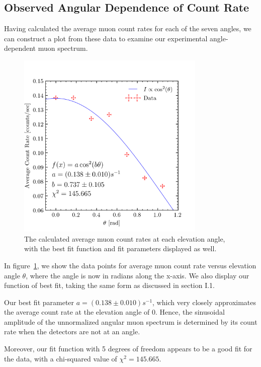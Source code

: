 \documentclass[aps,twocolumn,secnumarabic,balancelastpage,amsmath,amssymb,nofootinbib, floatfix]{revtex4-2}
\begin{document}
	\subsection{Observed Angular Dependence of Count Rate}
	Having calculated the average muon count rates for each of the seven angles, we can construct a plot from these data to examine our experimental angle-dependent muon spectrum. 
	\begin{figure}[H]
		\includegraphics[width=9cm]{rate_vs_theta_fitted.png}
		\caption{The calculated average muon count rates at each elevation angle, with the best fit function and fit parameters displayed as well.}
		\label{fig:ang_fit}
	\end{figure}
	In figure~\ref{fig:ang_fit}, we show the data points for average muon count rate versus elevation angle $\theta$, where the angle is now in radians along the x-axis. We also display our function of best fit, taking the same form as discussed in section I.1. 
	
	Our best fit parameter $a=(0.138\pm0.010)s^{-1}$, which very closely approximates the average count rate at the elevation angle of 0. Hence, the sinusoidal amplitude of the unnormalized angular muon spectrum is determined by its count rate when the detectors are not at an angle.
	
	Moreover, our fit function with 5 degrees of freedom appears to be a good fit for the data, with a chi-squared value of $\chi^{2}=145.665$.
	
	
\end{document}
